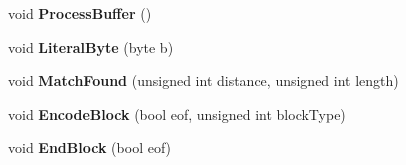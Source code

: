 \begin{DoxyCompactItemize}
\item 
\hypertarget{class_deflator_a3002c3031d2432fa3d201caeec1a7f4b}{
void {\bfseries ProcessBuffer} ()}
\label{class_deflator_a3002c3031d2432fa3d201caeec1a7f4b}

\item 
\hypertarget{class_deflator_a0eb8a43b8797d2f21c48f666017924c3}{
void {\bfseries LiteralByte} (byte b)}
\label{class_deflator_a0eb8a43b8797d2f21c48f666017924c3}

\item 
\hypertarget{class_deflator_a5a5cb6258e2cfa731e47dfe33e2f9e4d}{
void {\bfseries MatchFound} (unsigned int distance, unsigned int length)}
\label{class_deflator_a5a5cb6258e2cfa731e47dfe33e2f9e4d}

\item 
\hypertarget{class_deflator_aa4ff23fce8e43dfb33f8e3660ce2a654}{
void {\bfseries EncodeBlock} (bool eof, unsigned int blockType)}
\label{class_deflator_aa4ff23fce8e43dfb33f8e3660ce2a654}

\item 
\hypertarget{class_deflator_af5ef6c8383d58a61e383ddd03b29e8ce}{
void {\bfseries EndBlock} (bool eof)}
\label{class_deflator_af5ef6c8383d58a61e383ddd03b29e8ce}

\end{DoxyCompactItemize}
